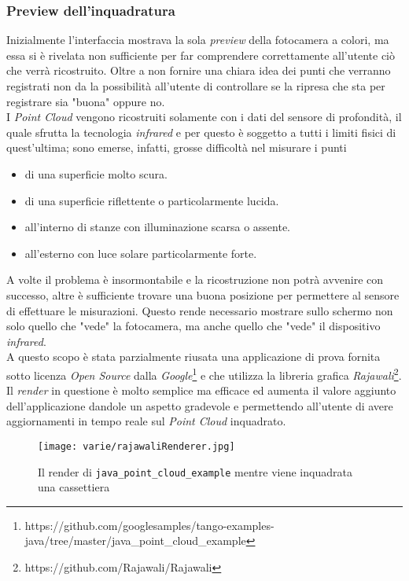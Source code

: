 \subsubsection{Preview dell'inquadratura}
\label{cap:frame_preview}
Inizialmente l'interfaccia mostrava la sola \emph{preview} della fotocamera a colori, ma essa si è rivelata non sufficiente per far comprendere correttamente all'utente ciò che verrà ricostruito. Oltre a non fornire una chiara idea dei punti che verranno registrati non da la possibilità all'utente di controllare se la ripresa che sta per registrare sia "buona" oppure no.\\
I \emph{Point Cloud} vengono ricostruiti solamente con i dati del sensore di profondità, il quale sfrutta la tecnologia \emph{infrared} e per questo è soggetto a tutti i limiti fisici di quest'ultima; sono emerse, infatti, grosse difficoltà nel misurare i punti
\begin{itemize}
	\item di una superficie molto scura.
	\item di una superficie riflettente o particolarmente lucida.
	\item all'interno di stanze con illuminazione scarsa o assente.
	\item all'esterno con luce solare particolarmente forte.
\end{itemize}
A volte il problema è insormontabile e la ricostruzione non potrà avvenire con successo, altre è sufficiente trovare una buona posizione per permettere al sensore di effettuare le misurazioni. Questo rende necessario mostrare sullo schermo non solo quello che "vede" la fotocamera, ma anche quello che "vede" il dispositivo \emph{infrared}.\\
A questo scopo è stata parzialmente riusata una applicazione di prova fornita sotto licenza \emph{Open Source} dalla \emph{Google}\footnote{https://github.com/googlesamples/tango-examples-java/tree/master/java\_point\_cloud\_example} e che utilizza la libreria grafica \emph{Rajawali}\footnote{https://github.com/Rajawali/Rajawali}.\\
Il \emph{render} in questione è molto semplice ma efficace ed aumenta il valore aggiunto dell'applicazione dandole un aspetto gradevole e permettendo all'utente di avere aggiornamenti in tempo reale sul \emph{Point Cloud} inquadrato.
\begin{figure}[H] 
    \centering 
    \texttt{[image: varie/rajawaliRenderer.jpg]} 
    \caption{Il render di \texttt{java\_point\_cloud\_example} mentre viene inquadrata una cassettiera}
\end{figure}


